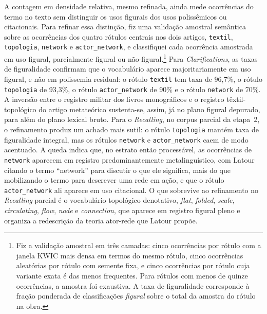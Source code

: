 A contagem em densidade relativa, mesmo refinada, ainda mede ocorrências do termo no texto sem distinguir os usos figurais dos usos polissêmicos ou citacionais. Para refinar essa distinção, fiz uma validação amostral semântica sobre as ocorrências dos quatro rótulos centrais nos dois artigos, \texttt{textil}, \texttt{topologia}, \texttt{network} e \texttt{actor\_network}, e classifiquei cada ocorrência amostrada em uso figural, parcialmente figural ou não-figural.\footnote{Fiz a validação amostral em três camadas: cinco ocorrências por rótulo com a janela KWIC mais densa em termos do mesmo rótulo, cinco ocorrências aleatórias por rótulo com semente fixa, e cinco ocorrências por rótulo cuja variante exata é das menos frequentes. Para rótulos com menos de quinze ocorrências, a amostra foi exaustiva. A taxa de figuralidade corresponde à fração ponderada de classificações \emph{figural} sobre o total da amostra do rótulo na obra.} Para \emph{Clarifications}, as taxas de figuralidade confirmam que o vocabulário aparece majoritariamente em uso figural, e não em polissemia residual: o rótulo \texttt{textil} tem taxa de 96,7\%, o rótulo \texttt{topologia} de 93,3\%, o rótulo \texttt{actor\_network} de 90\% e o rótulo \texttt{network} de 70\%. A inversão entre o registro militar dos livros monográficos e o registro têxtil-topológico do artigo metateórico sustenta-se, assim, já no plano figural depurado, para além do plano lexical bruto. Para o \emph{Recalling}, no corpus parcial da etapa~2, o refinamento produz um achado mais sutil: o rótulo \texttt{topologia} mantém taxa de figuralidade integral, mas os rótulos \texttt{network} e \texttt{actor\_network} caem de modo acentuado. A queda indica que, no estrato então processável, as ocorrências de \texttt{network} aparecem em registro predominantemente metalinguístico, com Latour citando o termo \enquote{network} para discutir o que ele significa, mais do que mobilizando o termo para descrever uma rede em ação, e que o rótulo \texttt{actor\_network} ali aparece em uso citacional. O que sobrevive ao refinamento no \emph{Recalling} parcial é o vocabulário topológico denotativo, \textit{flat}, \textit{folded}, \textit{scale}, \textit{circulating}, \textit{flow}, \textit{node} e \textit{connection}, que aparece em registro figural pleno e organiza a redescrição da teoria ator-rede que Latour propõe.

